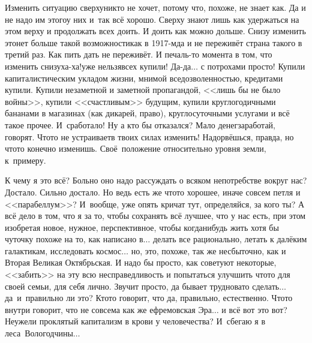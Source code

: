 Изменить ситуацию сверху\mdash никто не хочет, потому что, похоже, не знает как. Да и не надо им этого\mdash у них и~так всё хорошо. Сверху знают лишь как удержаться на этом верху и продолжать всех доить. И доить как можно дольше. Снизу изменить это\mdash нет больше такой возможности\mdash как в 1917-м\mdash да и не переживёт страна такого в третий раз. Как пить дать не переживёт. И печаль-то момента в том, что изменить снизу\mdash ха-ха!\mdash уже нельзя\mdash всех купили! Да-да$\ldots$ с потрохами просто! Купили капиталистическим укладом жизни, мнимой вседозволенностью, кредитами купили. Купили незаметной и заметной пропагандой, <<лишь бы не было войны>>, купили <<счастливым>> будущим, купили круглогодичными бананами в магазинах (как дикарей, право), круглосуточными услугами и всё такое прочее. И~сработало! Ну а кто бы отказался? Мало денег\mdash заработай, говорят. Что\sdash то не устраивает\mdash в твоих силах изменить! Надорвёшься, правда, но что\sdash то конечно изменишь. Своё~положение относительно уровня земли, к~примеру.

К чему я это всё? Больно оно надо рассуждать о всяком непотребстве вокруг нас? Достало. Сильно достало. Но ведь есть же что\sdash то хорошее, иначе совсем петля и <<парабеллум>>? И~вообще, уже опять кричат тут, определяйся, за кого ты? А всё дело в том, что я за то, чтобы сохранять всё лучшее, что у нас есть, при этом изобретая новое, нужное, перспективное, чтобы когда\sdash нибудь жить хотя бы чуточку похоже на то, как написано в\cite{ТуманностьАндромеды}$\ldots$ делать все рационально, летать к далёким галактикам, исследовать космос$\ldots$ но, это, похоже, так же несбыточно, как и Вторая Великая Октябрьская. И надо бы просто, как советуют некоторые, <<забить>> на эту всю несправедливость и попытаться улучшить что\sdash то для своей семьи, для себя лично. Звучит просто, да бывает трудновато сделать$\ldots$ да~и~правильно ли это? Кто\sdash то говорит, что да, правильно, естественно. Что\sdash то внутри говорит, что не совсем\mdash а как же ефремовская Эра$\ldots$ и всё вот это вот? Неужели проклятый капитализм в крови у человечества? И~сбегаю я в леса~Вологодчины$\ldots$ 

